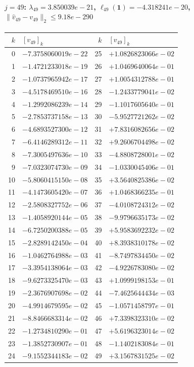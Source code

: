 \paragraph{$j = 49$: $\lambda_{49} = 3.850039e-21$, \quad $\ell_{49}(\mathbf{1}) = -4.318241e-20$, \quad $\|\hat{v}_{49} - v_{49}\|_2 \leq 9.18e-290$}
\begin{center}
{\footnotesize
\begin{tabular}{r@{\;\;}l@{\quad}r@{\;\;}l}
\toprule
$k$ & $[v_{49}]_k$ & $k$ & $[v_{49}]_k$ \\
\midrule
0 & $-7.3758060019e-22$ & 25 & $+1.0826823066e-02$ \\
1 & $-1.4721233018e-19$ & 26 & $+1.0469640064e-01$ \\
2 & $-1.0737965942e-17$ & 27 & $+1.0054312788e-01$ \\
3 & $-4.5178469510e-16$ & 28 & $-1.2433779041e-02$ \\
4 & $-1.2992086239e-14$ & 29 & $-1.1017605640e-01$ \\
5 & $-2.7853737158e-13$ & 30 & $-5.9527721262e-02$ \\
6 & $-4.6893527300e-12$ & 31 & $+7.8316082656e-02$ \\
7 & $-6.4146289312e-11$ & 32 & $+9.2606704498e-02$ \\
8 & $-7.3005497636e-10$ & 33 & $-4.8808728001e-02$ \\
9 & $-7.0323074730e-09$ & 34 & $-1.0330045406e-01$ \\
10 & $-5.8060415150e-08$ & 35 & $+3.5640825386e-02$ \\
11 & $-4.1473605420e-07$ & 36 & $+1.0468366235e-01$ \\
12 & $-2.5808327752e-06$ & 37 & $-4.0108724312e-02$ \\
13 & $-1.4058920144e-05$ & 38 & $-9.9796635173e-02$ \\
14 & $-6.7250200388e-05$ & 39 & $+5.9583692232e-02$ \\
15 & $-2.8289142450e-04$ & 40 & $+8.3938310178e-02$ \\
16 & $-1.0462764988e-03$ & 41 & $-8.7497834450e-02$ \\
17 & $-3.3954138064e-03$ & 42 & $-4.9226783080e-02$ \\
18 & $-9.6273325470e-03$ & 43 & $+1.0999198153e-01$ \\
19 & $-2.3676907698e-02$ & 44 & $-7.4625644434e-03$ \\
20 & $-4.9914679595e-02$ & 45 & $-1.0571458797e-01$ \\
21 & $-8.8466683314e-02$ & 46 & $+7.3398323310e-02$ \\
22 & $-1.2734810290e-01$ & 47 & $+5.6196323014e-02$ \\
23 & $-1.3852730907e-01$ & 48 & $-1.1402183084e-01$ \\
24 & $-9.1552344183e-02$ & 49 & $+3.1567831525e-02$ \\
\bottomrule
\end{tabular}
}
\end{center}

